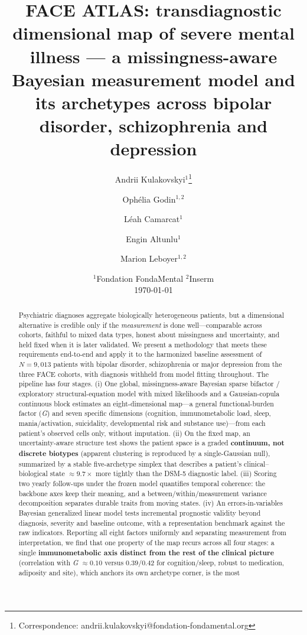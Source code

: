 \documentclass[11pt]{article}
\title{\bfseries FACE ATLAS: transdiagnostic dimensional map
of severe mental illness --- a missingness-aware Bayesian measurement model and its archetypes
across bipolar disorder, schizophrenia and depression}
\author{%
  Andrii Kulakovskyi$^{1}$\thanks{Correspondence: andrii.kulakovskyi@fondation-fondamental.org}\and
  Ophélia Godin$^{1,2}$\and
  Léah Camarcat$^{1}$\and
  Engin Altunlu$^{1}$\and
  Marion Leboyer$^{1,2}$
}
\date{%
  $^{1}$Fondation FondaMental \quad
  $^{2}$Inserm\\[4pt]
  \today
}
\newcommand{\Gfac}{\textit{G}}            %
\begin{document}
\maketitle

\begin{abstract}
\noindent
Psychiatric diagnoses aggregate biologically heterogeneous patients, but a dimensional
alternative is credible only if the \emph{measurement} is done well---comparable across
cohorts, faithful to mixed data types, honest about missingness and uncertainty, and held
fixed when it is later validated. We present a methodology that meets these requirements
end-to-end and apply it to the harmonized baseline assessment of $N=9{,}013$ patients with
bipolar disorder, schizophrenia or major depression from the three FACE cohorts, with
diagnosis withheld from model fitting throughout. The pipeline has four stages. (i) One
global, missingness-aware Bayesian sparse bifactor / exploratory structural-equation model
with mixed likelihoods and a Gaussian-copula continuous block estimates an eight-dimensional
map---a general functional-burden factor (\Gfac) and seven specific dimensions (cognition,
immunometabolic load, sleep, mania/activation, suicidality, developmental risk and substance
use)---from each patient's observed cells only, without imputation. (ii) On the fixed map, an
uncertainty-aware structure test shows the patient space is a graded \textbf{continuum, not
discrete biotypes} (apparent clustering is reproduced by a single-Gaussian null), summarized
by a stable five-archetype simplex that describes a patient's clinical--biological state
$\approx 9.7\times$ more tightly than the DSM-5 diagnostic label. (iii) Scoring two yearly
follow-ups under the frozen model quantifies temporal coherence: the backbone axes keep their
meaning, and a between/within/measurement variance decomposition separates durable traits from
moving states. (iv) An errors-in-variables Bayesian generalized linear model tests incremental
prognostic validity beyond diagnosis, severity and baseline outcome, with a representation
benchmark against the raw indicators. Reporting all eight factors uniformly and
separating measurement from interpretation, we find that one property of the map recurs across
all four stages: a single \textbf{immunometabolic axis distinct from the rest of the clinical
picture} (correlation with \Gfac{} $\approx 0.10$ versus $0.39$/$0.42$ for cognition/sleep,
robust to medication, adiposity and site), which anchors its own archetype corner, is the most

\end{abstract}
\end{document}
